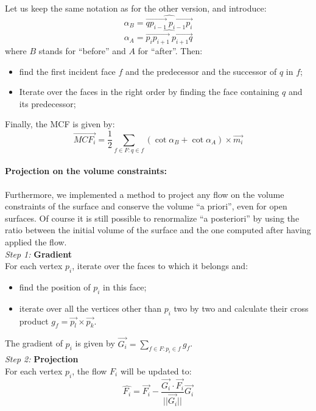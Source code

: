 \documentclass{article}
\begin{document}
Let us keep the same notation as for the other version, and introduce:
\begin{equation*}
  \alpha_B = \widehat{\overrightarrow{q p_{i-1}} ~ \overrightarrow{p_{i-1} p_{i}}}
\end{equation*}
\begin{equation*}
  \alpha_A = \widehat{\overrightarrow{p_i p_{i+1}} ~ \overrightarrow{p_{i+1} q}}
\end{equation*}
where $B$ stands for ``before'' and $A$ for ``after''. Then:
\begin{itemize}
  \item find the first incident face $f$ and the predecessor and the successor of $q$ in $f$;
  \item Iterate over the faces in the right order by finding the face containing $q$ and its predecessor;
\end{itemize}
Finally, the MCF is given by:
\begin{equation*}
  \overrightarrow{MCF_i} = \frac{1}{2} \sum_{f \in F : q \in f} (\cot{\alpha_B} + \cot{\alpha_A}) \times \overrightarrow{m_i}
\end{equation*}

\paragraph*{Projection on the volume constraints:}
Furthermore, we implemented a method to project any flow on the volume constraints
of the surface and conserve the volume ``a priori'', even for open surfaces.
Of course it is still possible to renormalize ``a posteriori'' by using
the ratio between the initial volume of the surface and the one computed
after having applied the flow.\\
\textit{Step 1:} \textbf{Gradient}\\
For each vertex $p_i$, iterate over the faces to which it belongs and:
\begin{itemize}
  \item find the position of $p_i$ in this face;
  \item iterate over all the vertices other than $p_i$ two by two and calculate their cross product $g_f = \overrightarrow{p_l} \times \overrightarrow{p_k} $.
\end{itemize}
The gradient of $p_i$ is given by $\overrightarrow{G_i} = \sum_{f \in F : p_i \in f} g_f$.\\
\textit{Step 2:} \textbf{Projection}\\
For each vertex $p_i$, the flow $F_i$ will be updated to:
\begin{equation*}
  \hat{F_i} = \overrightarrow{F_i} -
  \frac{\overrightarrow{G_i} \cdot \overrightarrow{F_i}}
    {||\overrightarrow{G_i}||}
  \overrightarrow{G_i}
\end{equation*}
\end{document}
